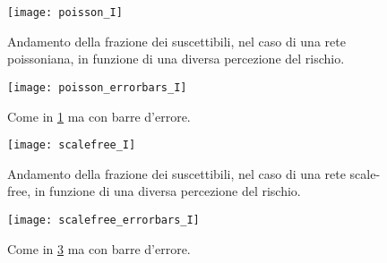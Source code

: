 \begin{figure}[h]
		\begin{center}
			\texttt{[image: poisson\_I]}
			\caption{Andamento della frazione dei suscettibili, nel caso di una rete poissoniana, in funzione di una diversa percezione del rischio.}
			\label{fig:sim_poisson}
		\end{center}
\end{figure}

\begin{figure}
		\begin{center}
			\texttt{[image: poisson\_errorbars\_I]}
			\caption{Come in \cref{fig:sim_poisson} ma con barre d'errore.}
			\label{fig:sim_poisson2}
		\end{center}
\end{figure}

\begin{figure}
		\begin{center}
			\texttt{[image: scalefree\_I]}
			\caption{Andamento della frazione dei suscettibili, nel caso di una rete scale-free, in funzione di una diversa percezione del rischio.}
			\label{fig:sim_scalefree}
		\end{center}
\end{figure}	

\begin{figure}
		\begin{center}
			\texttt{[image: scalefree\_errorbars\_I]}
			\caption{Come in \cref{fig:sim_scalefree} ma con barre d'errore.}
			\label{fig:sim_scalefree2}
		\end{center}
\end{figure}	